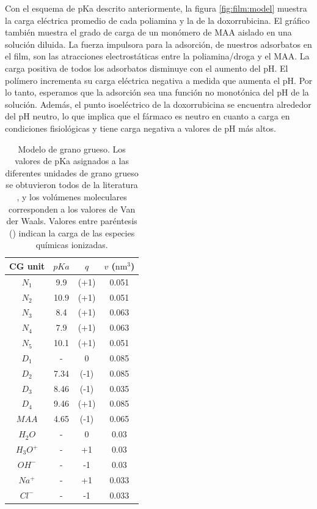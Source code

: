 Con el esquema de pKa descrito anteriormente, la figura \ref{fig:film:model} muestra la carga el\'ectrica promedio de cada poliamina y la de la doxorrubicina. El gr\'afico tambi\'en muestra el grado de carga de un mon\'omero de MAA aislado en una soluci\'on diluida. La fuerza impulsora para la adsorci\'on, de nuestros adsorbatos en el film,  son las atracciones electrost\'aticas entre la poliamina/droga y el MAA. La carga positiva de todos los adsorbatos disminuye con el aumento del pH. El pol\'imero incrementa su carga el\'ectrica negativa  a medida que aumenta el pH. Por lo tanto, esperamos que la adsorci\'on sea una funci\'on no monot\'onica del pH de la soluci\'on. Adem\'as, el punto isoel\'ectrico de la doxorrubicina se encuentra alrededor del pH neutro, lo que implica que el f\'armaco es neutro en cuanto a carga en condiciones fisiol\'ogicas y tiene carga negativa a valores de pH m\'as altos.



\begin{table}[!ht]
	\begin{centering}
		\centering
		\setlength{\tabcolsep}{2.2pt}
		\begin{tabular}{|cccc|}
			\hline 
			\hspace{0pt}CG unit   & $pKa$ & $q$  & $v$ ($\text{nm}^3$)  \\ \hline
			$N_1$& 9.9 & (+1) &0.051\\
			$N_2$& 10.9& (+1) & 0.051\\ 
		     $N_3$& 8.4& (+1)& 0.063\\
		     $N_4$&7.9& (+1) & 0.063\\
		     $N_5$& 10.1& (+1)& 0.051\\
		      $D_1$&  - & 0 &0.085\\
		     $D_2$& 7.34 & (-1) & 0.085\\ 
			 $D_3$&  8.46& (-1)& 0.035\\
			$D_4$&  9.46 & (+1) &0.085\\ 
			$MAA$&  4.65 & (-1) & 0.065\\
			$H_2O$ & - & 0 & 0.03\\
			$H_3O^+$ & - & +1 & 0.03\\
			$OH^-$ & - & -1 & 0.03\\
			$Na^+$ & - & +1 & 0.033\\ 
			$Cl^-$ & - & -1 & 0.033\\ \hline
		\end{tabular}		
		\caption{Modelo de grano grueso. Los valores de pKa asignados a las diferentes unidades de grano grueso se obtuvieron todos de la literatura \cite{agostinelli2010polyamines,casero2009,puchem}, y los vol\'umenes moleculares corresponden a los valores de Van der Waals. Valores entre par\'entesis () indican la carga de las especies qu\'imicas ionizadas.}
		\label{table:CG}
	\end{centering}
\end{table}

